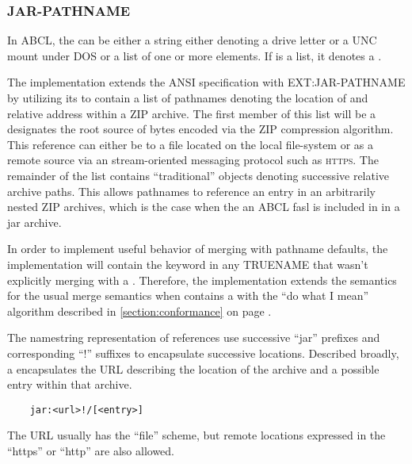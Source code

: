 \documentclass[10pt]{book}
\begin{document}
\label{section:jar-pathname}

\subsubsection{JAR-PATHNAME}
\label{section:JAR-PATHNAME}

In \textsc{ABCL}, the  can be either a string either
denoting a drive letter or a UNC mount under \textsc{DOS} or a list of
one or more elements.  If  is a list, it denotes a
.

The implementation extends the \textsc{ANSI} specification with
\textsc{EXT:JAR-PATHNAME} by utilizing its  to contain a
list of pathnames denoting the location of and relative address within
a \textsc{ZIP} archive.  The first member of this list will be a
 designates the root source of bytes encoded
via the \textsc{ZIP} compression algorithm.  This reference can either
be to a file located on the local file-system or as a remote source
via an stream-oriented messaging protocol such as \textsc{https}.  The
remainder of the  list contains ``traditional''
 objects denoting successive relative archive paths.
This allows pathnames to reference an entry in an arbitrarily nested
ZIP archives, which is the case when the an ABCL fasl is included in
in a jar archive.
 
In order to implement useful behavior of merging with pathname
defaults, the implementation will contain the 
keyword in any TRUENAME that wasn't explicitly merging with a
.  Therefore, the implementation extends the
semantics for the usual merge semantics when
 contains a 
with the ``do what I mean'' algorithm described in
\ref{section:conformance} on page \pageref{section:conformance}.

The namestring representation of  references
use successive ``jar'' prefixes and corresponding ``!'' suffixes to
encapsulate successive locations.  Described broadly, a
 encapsulates the \textsc{URL} describing the
location of the archive and a possible entry within that archive.

\begin{verbatim}
    jar:<url>!/[<entry>]
\end{verbatim}

The \textsc{URL} usually has the ``file'' scheme, but remote locations
expressed in the ``https'' or ``http'' are also allowed.
\end{document}

